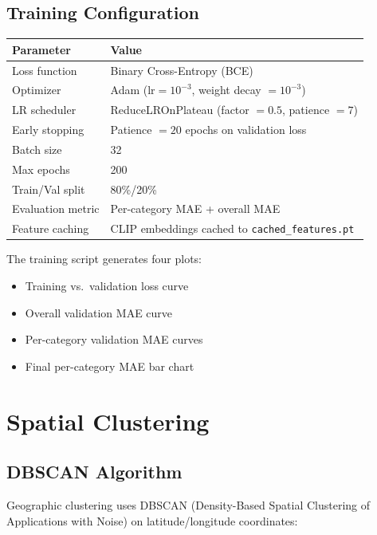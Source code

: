 \documentclass[11pt,a4paper]{article}
\begin{document}
\subsection{Training Configuration}

\begin{table}[H]
\centering
\begin{tabular}{ll}
\toprule
\textbf{Parameter} & \textbf{Value} \\
\midrule
Loss function & Binary Cross-Entropy (BCE) \\
Optimizer & Adam ($\text{lr} = 10^{-3}$, weight decay $= 10^{-3}$) \\
LR scheduler & ReduceLROnPlateau (factor $= 0.5$, patience $= 7$) \\
Early stopping & Patience $= 20$ epochs on validation loss \\
Batch size & 32 \\
Max epochs & 200 \\
Train/Val split & 80\%/20\% \\
Evaluation metric & Per-category MAE + overall MAE \\
Feature caching & CLIP embeddings cached to \texttt{cached\_features.pt} \\
\bottomrule
\end{tabular}
\end{table}

The training script generates four plots:
\begin{itemize}
    \item Training vs.\ validation loss curve
    \item Overall validation MAE curve
    \item Per-category validation MAE curves
    \item Final per-category MAE bar chart
\end{itemize}

\newpage
\section{Spatial Clustering}

\subsection{DBSCAN Algorithm}

Geographic clustering uses DBSCAN (Density-Based Spatial Clustering of Applications with Noise) on latitude/longitude coordinates:
\end{document}
